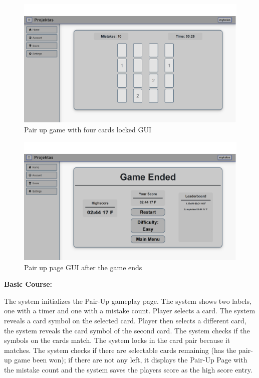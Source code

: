 \documentclass[11pt,a4paper]{article}
\newcommand{\heading}[1]{\vspace{1em}\noindent\textbf{#1}\par\vspace{0.5em}}
\begin{document}
\begin{figure}[H]
    \centering
    \includegraphics[width=1\textwidth,keepaspectratio]{PSI_3rd_trial/PNGs/pair_up_4.png}
    \caption{Pair up game with four cards locked GUI}
    \label{fig:pair_up_4}
\end{figure}

\begin{figure}[H]
    \centering
    \includegraphics[width=1\textwidth,keepaspectratio]{PSI_3rd_trial/PNGs/pair_up_5.png}
    \caption{Pair up page GUI after the game ends}
    \label{fig:pair_up_5}
\end{figure}

\heading{Basic Course:}
The system initializes the Pair-Up gameplay page. The system shows two labels, one with a timer and one with a mistake count. Player selects a card. The system reveals a card symbol on the selected card. Player then selects a different card, the system reveals the card symbol of the second card. The system checks if the symbols on the cards match. The system locks in the card pair because it matches. The system checks if there are selectable cards remaining (has the pair-up game been won); if there are not any left, it displays the Pair-Up Page with the mistake count and the system saves the players score as the high score entry.
\end{document}
